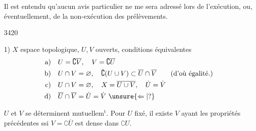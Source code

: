 Il est entendu qu'aucun avis particulier ne me sera adressé lors de l'exécution, ou, éventuellement, de la non-exécution des prélèvements.

\begin{flushright}\small 3420\\\end{flushright}


1) $X$ espace topologique, $U,V$ ouverts, conditions équivalentes
\[
\begin{aligned}
\text{a)}\quad & U=\complement\overline V,\quad V=\complement\overline U\\
\text{b)}\quad & U\cap V=\varnothing,\quad\complement(U\cup V)\subset\overline U\cap\overline V
 \qquad\text{(d'où égalité.)}\\
\text{c)}\quad & U\cap V=\varnothing,\quad X=\overline{U\cup V},\quad\dot U=\dot V\\
\text{d)}\quad & \overline U\cap\overline V=\dot U=\dot V\ \unsure{\Leftarrow|?}
\end{aligned}
\]

$U$ et $V$ se déterminent mutuellem$^{\mathrm t}$. Pour $U$ fixé, il existe $V$ ayant les propriétés précédentes ssi $V=\complement\overline U$ est dense dans $\complement U$.

